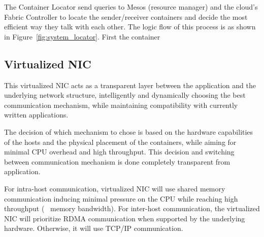 The Container Locator send queries to Mesos (resource manager) and the cloud's Fabric Controller to locate
the sender/receiver containers and decide the most efficient way they talk with each other.
The logic flow of this process is as shown in Figure~\ref{fig:system_locator}.
First the container 




\subsection{Virtualized NIC}
This virtualized NIC acts as a transparent layer between the application and the underlying network structure, intelligently and dynamically choosing the best communication mechanism, while maintaining compatibility with currently written applications.

The decision of which mechanism to chose is based on the hardware capabilities of the hosts and the physical placement of the containers, while aiming for minimal CPU overhead and high throughput. This decision and switching between communication mechanism is done completely transparent from application.

For intra-host communication, virtualized NIC will use shared memory communication inducing minimal pressure on the CPU while reaching high throughput (~ memory bandwidth). For inter-host communication, the virtualized NIC will prioritize RDMA communication when supported by the underlying hardware. Otherwise, it will use TCP/IP communication. 


